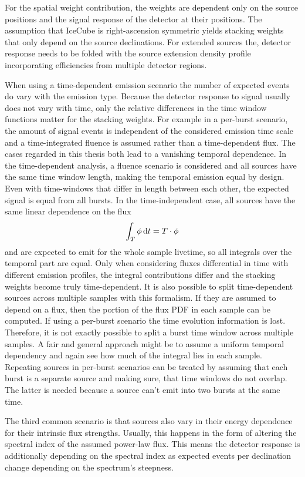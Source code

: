 For the spatial weight contribution, the weights are dependent only on the source positions and the signal response of the detector at their positions.
The assumption that IceCube is right-ascension symmetric yields stacking weights that only depend on the source declinations.
For extended sources the, detector response needs to be folded with the source extension density profile incorporating efficiencies from multiple detector regions.

When using a time-dependent emission scenario the number of expected events do vary with the emission type.
Because the detector response to signal usually does not vary with time, only the relative differences in the time window functions matter for the stacking weights.
For example in a per-burst scenario, the amount of signal events is independent of the considered emission time scale and a time-integrated fluence is assumed rather than a time-dependent flux.
The cases regarded in this thesis both lead to a vanishing temporal dependence.
In the time-dependent analysis, a fluence scenario is considered and all sources have the same time window length, making the temporal emission equal by design.
Even with time-windows that differ in length between each other, the expected signal is equal from all bursts.
In the time-independent case, all sources have the same linear dependence on the flux
\begin{equation}
  \int_T \phi \,\mathrm{d}t = T\cdot \phi
\end{equation}
and are expected to emit for the whole sample livetime, so all integrals over the temporal part are equal.
Only when considering fluxes differential in time with different emission profiles, the integral contributions differ and the stacking weights become truly time-dependent.
It is also possible to split time-dependent sources across multiple samples with this formalism.
If they are assumed to depend on a flux, then the portion of the flux PDF in each sample can be computed.
If using a per-burst scenario the time evolution information is lost.
Therefore, it is not exactly possible to split a burst time window across multiple samples.
A fair and general approach might be to assume a uniform temporal dependency and again see how much of the integral lies in each sample.
Repeating sources in per-burst scenarios can be treated by assuming that each burst is a separate source and making sure, that time windows do not overlap.
The latter is needed because a source can't emit into two bursts at the same time.

The third common scenario is that sources also vary in their energy dependence for their intrinsic flux strengths.
Usually, this happens in the form of altering the spectral index of the assumed power-law flux.
This means the detector response is additionally depending on the spectral index as expected events per declination change depending on the spectrum's steepness.

